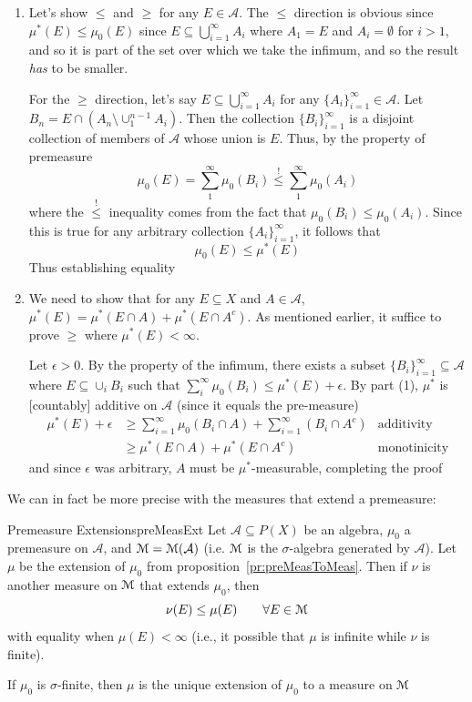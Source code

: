 \documentclass[oneside]{book}
\newcommand{\CA}{\mathcal{A}}
\newcommand{\MM}{\EuScript{M}}
\newcommand{\sse}{\subseteq}
\begin{document}
\begin{Proof}
	\begin{enumerate}
		\item Let's show $\le$ and $\ge$ for any $E \in \CA$. The $\le$ direction is obvious since $\mu^*(E) \le
			\mu_0(E)$ since $E \sse \bigcup_{i=1}^\infty A_i$ where $A_1 = E$ and $A_i = \emptyset$ for $i > 1$, and so
			it is part of the set over which we take the infimum, and so the result \emph{has} to be smaller. 

			For the $\ge$ direction, let's say $E \sse \bigcup_{i=1}^\infty A_i$ for any $\{A_i\}_{i=1}^\infty \in \CA$.
			Let $B_n = E\cap \left(A_n \setminus \cup_1^{n-1}A_i\right)$. Then the collection $\{B_i\}_{i=1}^\infty$ is
			a disjoint collection of members of $\CA$ whose union is $E$. Thus, by the property of premeasure
			\[
				\mu_0(E) = \sum_1^\infty \mu_0(B_i) \overset{!}{\le} \sum_1^\infty \mu_0(A_i)
			\]
			where the $\overset{!}{\le}$ inequality comes from the fact that $\mu_0(B_i) \le \mu_0(A_i)$. Since this is
			true for any arbitrary collection $\{A_i\}_{i=1}^\infty$, it follows that 
			\[
				\mu_0(E) \le \mu^*(E)
			\]
			Thus establishing equality
		\item We need to show that for any $E \sse X$ and $A \in \CA$, $\mu^*(E) = \mu^*(E\cap A) + \mu^*(E\cap A^c)$.
			As mentioned earlier, it suffice to prove $\ge$ where $\mu^*(E) < \infty$. 

			Let $\epsilon > 0$. By the property of the infimum, there exists a subset $\{B_i\}_{i=1}^\infty \sse \CA$
			where $E\sse \cup_i B_i$ such that $\sum_i^\infty \mu_0(B_i) \le \mu^*(E) + \epsilon$. By part (1), $\mu^*$ is
			[countably] additive on $\CA$ (since it equals the pre-measure)
			\begin{align*}
				\mu^*(E) + \epsilon &\ge \sum_{i=1}^\infty \mu_0(B_i\cap A) + \sum_{i=1}^\infty (B_i\cap
				A^c)&\text{additivity}\\
					&\ge \mu^*(E\cap A) + \mu^*(E\cap A^c) &\text{monotinicity}
			\end{align*}
			and since $\epsilon$ was arbitrary, $A$ must be $\mu^*$-measurable, completing the proof
	\end{enumerate}
\end{Proof}

We can in fact be more precise with the measures that extend a premeasure: 

\begin{thm}{Premeasure Extensions}{preMeasExt}
	Let $\CA \sse P(X)$ be an algebra, $\mu_0$ a premeasure on $\CA$, and $\MM = \MM(\CA)$ (i.e. $\MM$ is the
	$\sigma$-algebra generated by $\CA$). Let $\mu$ be the extension of $\mu_0$ from proposition~\ref{pr:preMeasToMeas}.
	Then if $\nu$ is another measure on $\MM$ that extends $\mu_0$, then
	\[
		\nu(E) \le \mu(E)\qquad \forall E \in \MM
	\]
	with equality when $\mu(E) < \infty$ (i.e., it possible that $\mu$ is infinite while $\nu$ is finite). 

	If $\mu_0$ is $\sigma$-finite, then $\mu$ is the unique extension of $\mu_0$ to a measure on $\MM$
\end{thm}
\end{document}
